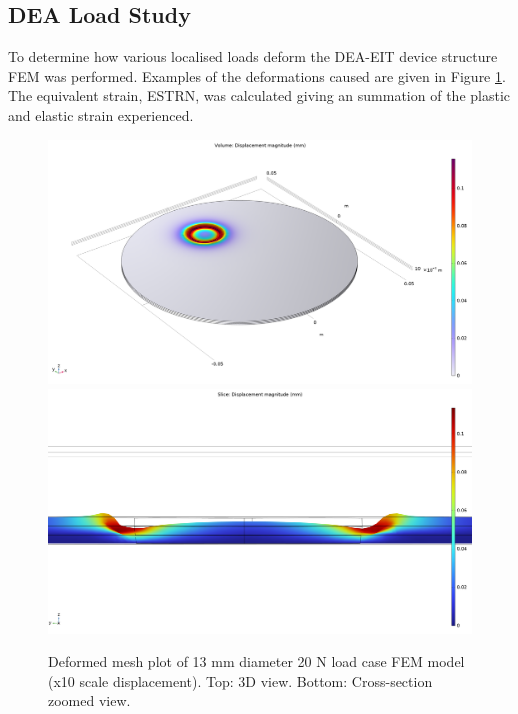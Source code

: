 \subsection{DEA Load Study}
To determine how various localised loads deform the DEA-EIT device structure FEM was performed. Examples of the deformations caused are given in Figure \ref{fig:FEM_DEA-EIT_loading}. The equivalent strain, ESTRN, was calculated giving an summation of the plastic and elastic strain experienced.
\begin{figure}[H]
	\centering
	\includegraphics[width=0.7\linewidth]{Figures/d13mm_load_3d_disp.png}
	\includegraphics[width=0.7\linewidth]{Figures/d13mm_load_zoom.png}
	\caption{Deformed mesh plot of 13 mm diameter 20 N load case FEM model (x10 scale displacement). Top: 3D view. Bottom: Cross-section zoomed view.}
	\label{fig:FEM_DEA-EIT_loading}
\end{figure}


